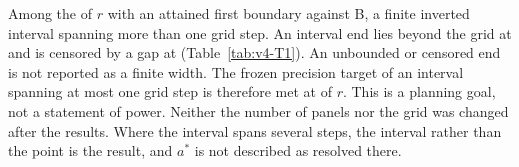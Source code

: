 Among the   of $r$ with an attained first boundary against B,   a finite inverted interval spanning more than one grid step. An interval end lies beyond the grid at   and is censored by a gap at   (Table~\ref{tab:v4-T1}). An unbounded or censored end is not reported as a finite width. %
The frozen precision target of an interval spanning at most one grid step is therefore met at   of $r$. This is a planning goal, not a statement of power. Neither the number of panels nor the grid was changed after the results. %
Where the interval spans several steps, the interval rather than the point is the result, and $a^*$ is not described as resolved there. %


